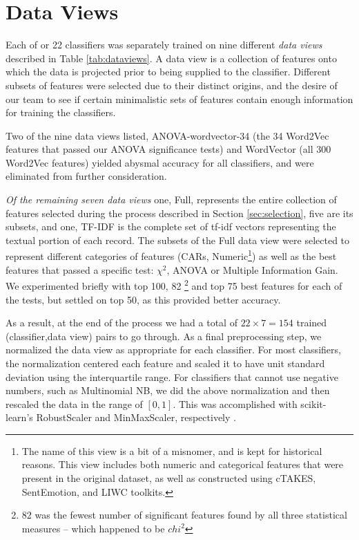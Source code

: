 \section{Data Views}

Each of or 22 classifiers 
was separately trained on nine different \textit{data views} described
in Table \ref{tab:dataviews}.  A data view is a collection of features
onto which the data is projected prior to being supplied to the classifier.
Different subsets of features were selected due to their distinct origins,
and the desire of our team to see if certain minimalistic sets of
features contain enough information for training the classifiers.

Two of the nine data views listed, 
\textsf{ANOVA-wordvector-34} (the 34 \textsf{Word2Vec} features that
passed our ANOVA significance tests) and \textsf{WordVector}
(all 300 \textsf{Word2Vec} features) yielded abysmal accuracy for
all classifiers, and were eliminated from further consideration.

\textit{Of the remaining seven data views} one, \textsf{Full}, represents 
the entire collection of features selected during
the process described in Section \ref{sec:selection}, five are its subsets,
and one, \textsf{TF-IDF} is the complete set of tf-idf vectors
representing the textual portion of each record. The subsets
of the \textsf{Full} data view were selected to represent different categories
of features (\textsf{CARs}, \textsf{Numeric}\footnote{The name
of this view is a bit of a misnomer, and is kept for historical reasons.
This view includes both numeric and categorical features that
were present in the original dataset, as well as constructed
using \textsf{cTAKES}, SentEmotion, and \textsf{LIWC} toolkits.}) as well
as the best features that passed a specific test: $\chi^2$, ANOVA or Multiple
Information Gain. We experimented briefly with top 100, 82 \footnote{82 was the fewest number of significant features found by all three statistical measures -- which happened to be $chi^2$} and top 75 best features
for each of the tests, but settled on top 50, as this provided better accuracy.

As a result, at the end of the process we had a total of $22\times 7 = 154$
trained (classifier,data view) pairs to go through. As a final preprocessing step, we normalized the data view as appropriate for each classifier. For most classifiers, the normalization centered each feature and scaled it to have unit standard deviation using the interquartile range. For classifiers that cannot use negative numbers, such as Multinomial NB, we did the above normalization and then rescaled the data in the range of $[0, 1]$. This was accomplished with \textsf{scikit-learn}'s \textsf{RobustScaler} and \textsf{MinMaxScaler}, respectively \cite{scikit-learn}. 



